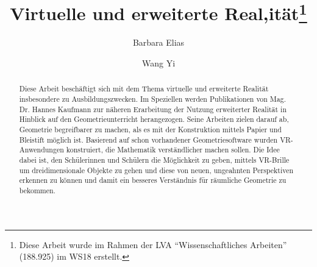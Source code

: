 \documentclass[deutsch]{llncs}
\begin{document}
\def\abstractname{Kurzfassung.}

\pagestyle{plain}

\title{Virtuelle und erweiterte Real‚ität\thanks{Diese Arbeit wurde im Rahmen der LVA ``Wissenschaftliches Arbeiten'' (188.925) im WS18 erstellt.}}




\author{Barbara Elias \and Wang Yi}


\maketitle

\setcounter{footnote}{0}

\begin{abstract}
Diese Arbeit beschäftigt sich mit dem Thema virtuelle und erweiterte Realität insbesondere zu Ausbildungszwecken. Im Speziellen werden Publikationen von Mag. Dr. Hannes Kaufmann zur näheren Erarbeitung der Nutzung erweiterter Realität in Hinblick auf den Geometrieunterricht herangezogen. Seine Arbeiten zielen darauf ab, Geometrie begreifbarer zu machen, als es mit der Konstruktion mittels Papier und Bleistift möglich ist. Basierend auf schon vorhandener Geometriesoftware wurden VR-Anwendungen konstruiert, die Mathematik verständlicher machen sollen. Die Idee dabei ist, den Schülerinnen und Schülern die Möglichkeit zu geben, mittels VR-Brille um dreidimensionale Objekte zu gehen und diese von neuen, ungeahnten Perspektiven erkennen zu können und damit ein besseres Verständnis für räumliche Geometrie zu bekommen. 
\end{abstract}
\end{document}
